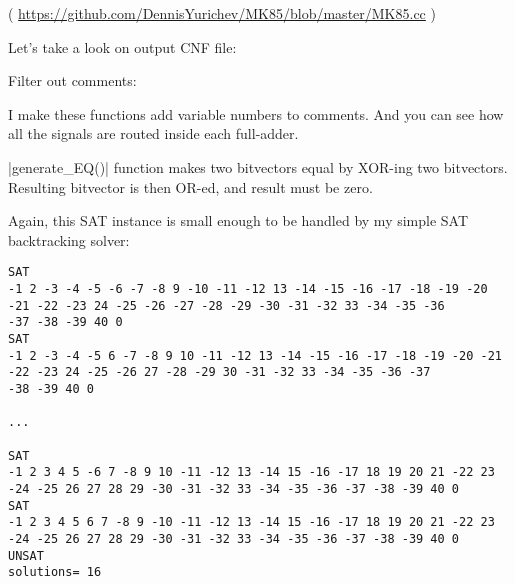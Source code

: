 ( \url{https://github.com/DennisYurichev/MK85/blob/master/MK85.cc} )

Let's take a look on output CNF file:



Filter out comments:



I make these functions add variable numbers to comments.
And you can see how all the signals are routed inside each full-adder.

|generate\_EQ()| function makes two bitvectors equal by XOR-ing two bitvectors.
Resulting bitvector is then OR-ed, and result must be zero.

Again, this SAT instance is small enough to be handled by my simple SAT backtracking solver:

\begin{lstlisting}
SAT
-1 2 -3 -4 -5 -6 -7 -8 9 -10 -11 -12 13 -14 -15 -16 -17 -18 -19 -20 -21 -22 -23 24 -25 -26 -27 -28 -29 -30 -31 -32 33 -34 -35 -36
-37 -38 -39 40 0
SAT
-1 2 -3 -4 -5 6 -7 -8 9 10 -11 -12 13 -14 -15 -16 -17 -18 -19 -20 -21 -22 -23 24 -25 -26 27 -28 -29 30 -31 -32 33 -34 -35 -36 -37
-38 -39 40 0

...

SAT
-1 2 3 4 5 -6 7 -8 9 10 -11 -12 13 -14 15 -16 -17 18 19 20 21 -22 23 -24 -25 26 27 28 29 -30 -31 -32 33 -34 -35 -36 -37 -38 -39 40 0
SAT
-1 2 3 4 5 6 7 -8 9 -10 -11 -12 13 -14 15 -16 -17 18 19 20 21 -22 23 -24 -25 26 27 28 29 -30 -31 -32 33 -34 -35 -36 -37 -38 -39 40 0
UNSAT
solutions= 16
\end{lstlisting}


